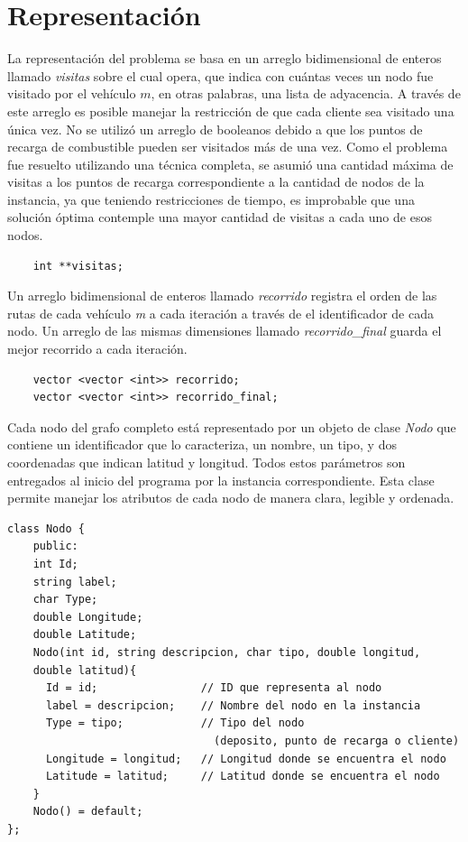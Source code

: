 \documentclass[letter, 10pt]{article}
\begin{document}
\section{Representación}
La representación del problema se basa en un arreglo bidimensional de enteros llamado \textit{visitas} sobre el cual opera, que indica con cuántas veces un nodo fue visitado por el vehículo $m$, en otras palabras, una lista de adyacencia. A través de este arreglo es posible manejar la restricción de que cada cliente sea visitado una única vez. No se utilizó un arreglo de booleanos debido a que los puntos de recarga de combustible pueden ser visitados más de una vez. Como el problema fue resuelto utilizando una técnica completa, se asumió una cantidad máxima de visitas a los puntos de recarga correspondiente a la cantidad de nodos de la instancia, ya que teniendo restricciones de tiempo, es improbable que una solución óptima contemple una mayor cantidad de visitas a cada uno de esos nodos. 
\begin{lstlisting}
    int **visitas;
\end{lstlisting}
Un arreglo bidimensional de enteros llamado \textit{recorrido} registra el orden de las rutas de cada vehículo \textit{m} a cada iteración a través de el identificador de cada nodo. Un arreglo de las mismas dimensiones llamado \textit{recorrido\_final} guarda el mejor recorrido a cada iteración.
\begin{lstlisting}
    vector <vector <int>> recorrido;
    vector <vector <int>> recorrido_final;
\end{lstlisting}
Cada nodo del grafo completo está representado por un objeto de clase \textit{Nodo} que contiene un identificador que lo caracteriza, un nombre, un tipo, y dos coordenadas que indican latitud y longitud. Todos estos parámetros son entregados al inicio del programa por la instancia correspondiente. Esta clase permite manejar los atributos de cada nodo de manera clara, legible y ordenada.
\begin{lstlisting}
class Nodo {
    public:
    int Id;
    string label;
    char Type;
    double Longitude;
    double Latitude;
    Nodo(int id, string descripcion, char tipo, double longitud, 
    double latitud){
      Id = id;                // ID que representa al nodo
      label = descripcion;    // Nombre del nodo en la instancia
      Type = tipo;            // Tipo del nodo 
                                (deposito, punto de recarga o cliente)
      Longitude = longitud;   // Longitud donde se encuentra el nodo
      Latitude = latitud;     // Latitud donde se encuentra el nodo
    }
    Nodo() = default;
};
\end{lstlisting}
\end{document}
